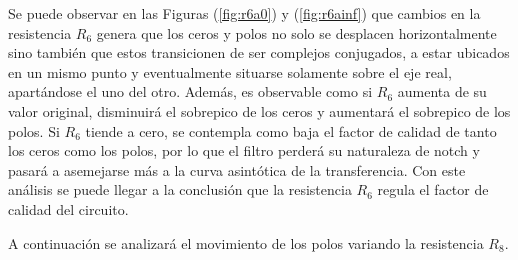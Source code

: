 \documentclass[a4paper]{article}
\begin{document}
Se puede observar en las Figuras (\ref{fig:r6a0}) y (\ref{fig:r6ainf}) que cambios en la resistencia $R_6$ genera que los ceros y polos no solo se desplacen horizontalmente sino también que estos transicionen de ser complejos conjugados, a estar ubicados en un mismo punto y eventualmente situarse solamente sobre el eje real, apartándose el uno del otro. Además, es observable como si $R_6$ aumenta de su valor original, disminuirá el sobrepico de los ceros y aumentará el sobrepico de los polos. Si $R_6$ tiende a cero, se contempla como baja el factor de calidad de tanto los ceros como los polos, por lo que el filtro perderá su naturaleza de notch y pasará a asemejarse más a la curva asintótica de la transferencia. Con este análisis se puede llegar a la conclusión que la resistencia $R_6$ regula el factor de calidad del circuito.


A continuación se analizará el movimiento de los polos variando la resistencia $R_8$. 
\end{document}
